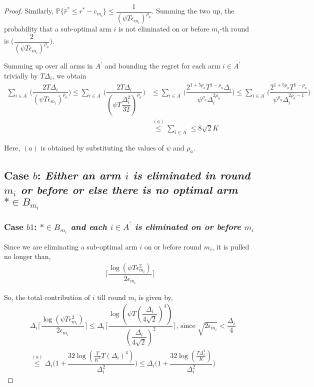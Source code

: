 \begin{proof}
 
Similarly, $\mathbb{P}\lbrace\hat{r}^{*}\leq r^{*} - c_{m_i}\rbrace\leq \dfrac{1}{(\psi  T\epsilon_{m_{i}})^{\rho_{a}}}$. Summing the two up, the probability that a sub-optimal arm ${i}$ is not eliminated on or before $m_{i}$-th round is  $\bigg(\dfrac{2}{(\psi T\epsilon_{m_{i}})^{\rho_{a}}}\bigg)$. 
 
Summing up over all arms in $A^{'}$ and bounding the regret for each arm $i\in A^{'}$ trivially by $T\Delta_{i}$, we obtain
   \begin{align*}
\sum_{i\in A^{'}}\bigg(\dfrac{2T\Delta_{i}}{(\psi T\epsilon_{m_{i}})^{\rho_{a}}}\bigg)
\leq\sum_{i\in A^{'}}\bigg(\dfrac{2T\Delta_{i}}{(\psi T\dfrac{\Delta_{i}^{2}}{32})^{\rho_{a}}}\bigg)
&\leq \sum_{i\in A^{'}}\bigg(\dfrac{2^{1+5\rho_{a}}T^{1-\rho_{a}}\Delta_{i}}{\psi^{\rho_{a}}\Delta_{i}^{2\rho_{a}}}\bigg)
\leq \sum_{i\in A^{'}}\bigg(\dfrac{2^{1+5\rho_{a}}T^{1-\rho_{a}}}{\psi^{\rho_{a}}\Delta_{i}^{2\rho_{a}-1}}\bigg)\\  
& \overset{(a)}{\leq}\sum_{i\in A^{'}}\leq 8\sqrt{2} K
   \end{align*}

Here, $(a)$ is obtained by substituting the values of $\psi$ and $\rho_a$.

\subsection*{Case $b$: \textit{Either an arm ${i}$ is eliminated in round $m_{i}$ or before or else there is no optimal arm ${*}\in B_{m_{i}}$ }}

\subsubsection*{Case $b1$: \textit{${*}\in B_{m_{i}}$ and each ${i}\in A^{'}$ is  eliminated on or before $m_{i}$ } }

 Since we are eliminating a sub-optimal arm ${i}$ on or before round $m_{i}$, it is pulled no longer than, 
 \begin{align*}
  \bigg\lceil\dfrac{\log{(\psi T\epsilon_{m_{i}}^{2})}}{2\epsilon_{m_{i}}}\bigg\rceil
 \end{align*}

So, the total contribution of ${i}$  till round $m_{i}$ is given by, 
\begin{align*}
&\Delta_{i}\bigg\lceil\dfrac{\log{(\psi T\epsilon_{m_{i}}^{2})}}{2\epsilon_{m_{i}}}\bigg\rceil
\leq\Delta_{i}\bigg\lceil\dfrac{\log{(\psi T(\dfrac{\Delta_{i}}{4\sqrt{2}})^{4})}}{(\dfrac{\Delta_{i}}{4\sqrt{2}})^{2}}\bigg\rceil \text{, since } \sqrt{2\epsilon_{m_{i}}} < \dfrac{\Delta_{i}}{4}\\
&\overset{(a)}{\leq}\Delta_{i}\bigg(1+\dfrac{32\log{(\frac{T}{K^2} T(\Delta_{i})^{4})}}{\Delta_{i}^{2}}\bigg)
\leq\Delta_{i}\bigg(1+\dfrac{32\log{( \frac{T\Delta_i^2}{K})}}{\Delta_{i}^{2}}\bigg)
\end{align*} 
 

\end{proof}
